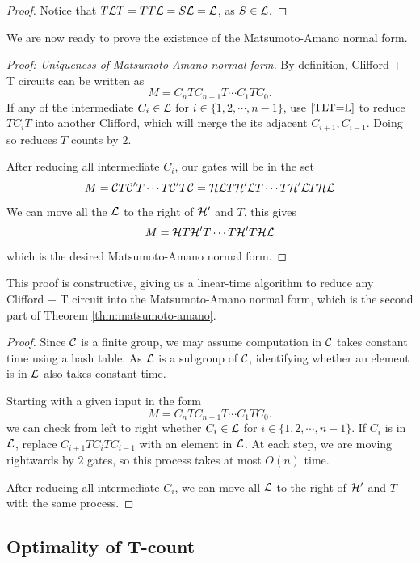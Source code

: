 \begin{proof}
	Notice that $T\mathcal{L} T = TT \mathcal{L} = S\mathcal{L} = \mathcal{L}$, as $S \in \mathcal{L}$.	
\end{proof}

We are now ready to prove the existence of the Matsumoto-Amano normal form.

\begin{proof}[Proof: Uniqueness of Matsumoto-Amano normal form]
	By definition, Clifford + T circuits can be written as 
	$$M = C_n T C_{n-1} T \cdots C_1 T C_0.$$
	If any of the intermediate $C_i \in \mathcal{L}$ for $i\in \{1, 2, \cdots, n-1\}$, use $\ref{TLT=L}$ to reduce $TC_iT$ into another Clifford, which will merge the its adjacent $C_{i+1}, C_{i-1}$. 
	Doing so reduces $T$ counts by $2$.
	
	After reducing all intermediate $C_i$, our gates will be in the set 
	\begin{dmath}
	M 
	= \C T \C' T \cdots T \C' T \C
	=  \H \L T \H' \L T \cdots T \H' \L T \H \L
	\end{dmath}
	We can move all the $\mathcal{L}$ to the right of $\mathcal{H}'$ and $T$, this gives 
	$$
	M = \mathcal{H} T \mathcal{H}' T \cdots T \mathcal{H}' T \mathcal{H} \mathcal{L}
	$$
	which is the desired Matsumoto-Amano normal form.
\end{proof}

This proof is constructive, giving us a linear-time algorithm to reduce any Clifford + T circuit into the Matsumoto-Amano normal form, which is the second part of Theorem \ref{thm:matsumoto-amano}.

\begin{proof}
	Since $\mathcal{C}$ is a finite group, we may assume computation in $\mathcal{C}$ takes constant time using a hash table.
	As $\mathcal{L}$ is a subgroup of $\mathcal{C}$, identifying whether an element is in $\mathcal{L}$ also takes constant time.
	
	Starting with a given input in the form
	$$M = C_n T C_{n-1} T \cdots C_1 T C_0.$$
	we can check from left to right whether $C_i \in \mathcal{L}$ for $i\in \{1, 2, \cdots, n-1\}$. 
	If $C_i$ is in $\mathcal{L}$, replace $C_{i+1} T C_i T C_{i-1}$ with an element in $\mathcal{L}$. 
	At each step, we are moving rightwards by $2$ gates, so this process takes at most $O(n)$ time.

	After reducing all intermediate $C_i$, we can move all $\mathcal{L}$ to the right of $\mathcal{H}'$ and $T$ with the same process.
\end{proof}

\subsection{Optimality of T-count}

